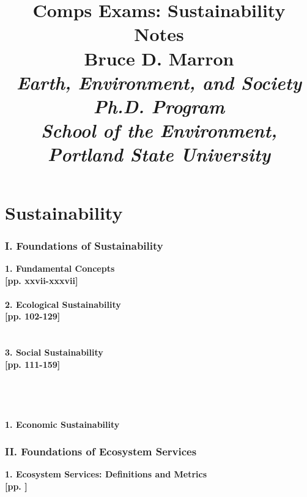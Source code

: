 \documentclass[12pt]{article}
\title{
\vspace{5mm}
\textmd{\textbf{Comps Exams: Sustainability Notes}}\\
\normalsize {Bruce D. Marron}\\
\textit{\normalsize {Earth, Environment, and Society Ph.D. Program\\
School of the Environment, Portland State University}}\\
}
\date{}
\begin{document}
\maketitle
\thispagestyle{empty}
\clearpage\maketitle


\section{Sustainability}


\subsubsection{I. Foundations of Sustainability}
\textbf{ 1. Fundamental Concepts}\\
\cite{harris_survey_2001} \textbf{[pp. xxvii-xxxvii]}\\
\cite{marshall_framing_2005}\\

\textbf{ 2. Ecological Sustainability}\\
\cite{pearce_blueprint_2000} \textbf{[pp. 102-129]}\\
\cite{folke_regime_2004}\\
\cite{schnaiberg_treadmill_2002}\\

\textbf{ 3. Social Sustainability}\\
\cite{sen_development_2000}\textbf{[pp. 111-159]}\\
\cite{pastor_environmental_2007}\\
\cite{miringoff_growing_1996}\\
\cite{oecd_well-being_2001}\\
\cite{berbes-blazquez_towards_2016}\\

\textbf{1. Economic Sustainability}\\


\subsubsection{II. Foundations of Ecosystem Services}

\textbf{ 1. Ecosystem Services: Definitions and Metrics}\\
\cite{millennium_ecosystem_assessment_program_ecosystems_2005} \textbf{[pp. ]}\\
\cite{wallace_classification_2007}\\
\cite{nelson_modeling_2009}\\
\cite{costanza_value_1997}\\
\cite{kremen_managing_2005}\\
\cite{muradian_reconciling_2010}\\
\cite{niemela_using_2010}\\
\cite{norgaard_ecosystem_2010}\\
\end{document}
